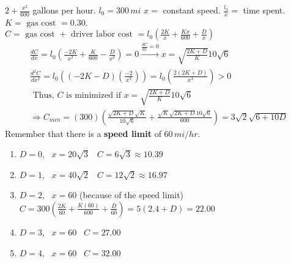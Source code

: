 \documentclass[twoside]{amsart}
\theoremstyle{plain}
\theoremstyle{definition}
\newcommand{\exercisehead}[1]
  {\smallskip
   \noindent{\small\bf Exercise #1.}}
\begin{document}
\exercisehead{19} $2 + \frac{x^2}{600}$ gallons per hour.  $l_0 = 300 \, mi$  $x = $ constant speed.  $\frac{ l_0}{x} = $ time spent.  $K = \text{ gas cost } = 0.30$.  \\
$C = \text{ gas cost } + \text{ driver labor cost } = l_0 \left( \frac{ 2 K}{x} + \frac{ K x }{ 600 } + \frac{D}{x} \right)$\[
\begin{gathered}
  \frac{dC}{dx} = l_0 \left( \frac{-2K}{x^2 } + \frac{K}{600} - \frac{D}{x^2} \right) = 0 \xrightarrow{ \frac{dC}{dx} = 0 } x = \sqrt{ \frac{ 2 K + D}{ K } } 10 \sqrt{6 } \\
  \frac{d^2 C}{dx^2} = l_0 \left( (-2K - D) \left( \frac{-2}{x^3} \right) \right) = l_0 \left( \frac{ 2 (2K+D)}{x^3 } \right) > 0 \\
  \text{ Thus, $C$ is minimized if } x = \sqrt{ \frac{2K+D}{ K} } 10 \sqrt{6}  \\
  \Longrightarrow  C_{min} = (300) \left( \frac{ \sqrt{ 2 K + D} \sqrt{K}}{ 10 \sqrt{6}} + \frac{ \sqrt{K} \sqrt{ 2K +D } 10\sqrt{6} }{ 600 } \right) = \boxed{ 3 \sqrt{2} \sqrt{ 6+ 10D} }
\end{gathered}
\]
Remember that there is a \textbf{ speed limit } of $60 \, mi/hr$.  

\begin{enumerate}
\item $D =0$, \quad \, $x = 20 \sqrt{3}$ \quad \, $C = 6 \sqrt{3} \approx 10.39$
\item $D = 1$, \quad \, $x = 40 \sqrt{2}$ \quad \, $C = 12\sqrt{2} \approx 16.97$
\item $D=2$, \quad \, $x = 60$ (because of the speed limit) \quad \, $C = 300\left( \frac{2K}{60} + \frac{ K(60)}{600} + \frac{D}{ 60} \right) = 5 ( 2.4 + D) = 22.00$ \\
\item $D=3$, \quad \, $x = 60$ \quad \, $C = 27.00$
\item $D=4$, \quad \, $x = 60$ \quad \, $C = 32.00$
\end{enumerate}
\end{document}
